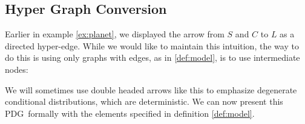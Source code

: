 \documentclass{article}
\newcommand{\MN}{PDG}
\begin{document}
	\subsection{Hyper Graph Conversion}\label{sec:hyper-convert}
	\begin{example}[continues=ex:planet]
		Earlier in example \ref{ex:planet}, we displayed the arrow from $S$ and $C$ to $L$ as a directed hyper-edge. While we would like to maintain this intuition, the way to do this is using only graphs with edges, as in \cref{def:model}, is to use intermediate nodes:
		
		\begin{center}
		\end{center}
		We will sometimes use double headed arrows like this to emphasize degenerate conditional distributions, which are deterministic.
		We can now present this \MN\ formally with the elements specified in definition \ref{def:model}.
		

\end{example}
\end{document}
